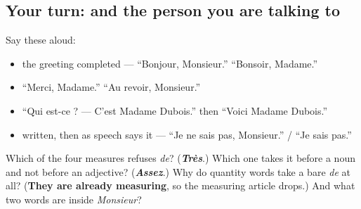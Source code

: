 \subsection*{Your turn: and the person you are talking to}
Say these aloud:

\begin{itemize}
\raggedright
  \item the greeting completed — \textquotedblleft{}Bonjour, Monsieur.\textquotedblright{} \textquotedblleft{}Bonsoir, Madame.\textquotedblright{}
  \item \textquotedblleft{}Merci, Madame.\textquotedblright{} \textquotedblleft{}Au revoir, Monsieur.\textquotedblright{}
  \item \textquotedblleft{}Qui est-ce ? — C'est Madame Dubois.\textquotedblright{} then \textquotedblleft{}Voici Madame Dubois.\textquotedblright{}
  \item written, then as speech says it — \textquotedblleft{}Je ne sais pas, Monsieur.\textquotedblright{} / \textquotedblleft{}Je sais pas.\textquotedblright{}
\end{itemize}

\begin{tcolorbox}[breakable,colback=teal!4,colframe=teal!35!black,title={Before you move on}]
Which of the four measures refuses \emph{de}? (\emph{\textbf{Très}}.) Which one takes it before a noun and not before an adjective? (\emph{\textbf{Assez}}.) Why do quantity words take a bare \emph{de} at all? (\textbf{They are already measuring}, so the measuring article drops.) And what two words are inside \emph{Monsieur}?
\end{tcolorbox}
